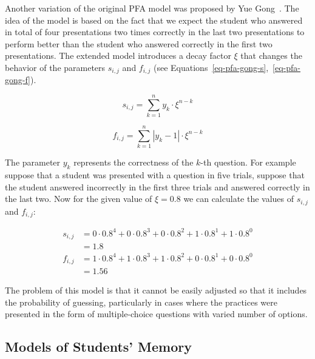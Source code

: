 Another variation of the original PFA model was proposed by Yue Gong~\cite{Gong2011}. The idea of the model is based on the fact that we expect the student who answered in total of four presentations two times correctly in the last two presentations to perform better than the student who answered correctly in the first two presentations. The extended model introduces a decay factor $\xi$ that changes the behavior of the parameters $s_{i,j}$ and $f_{i,j}$ (see Equations~\ref{eq-pfa-gong-s},~\ref{eq-pfa-gong-f}).

\begin{equation} \label{eq-pfa-gong-s}
  s_{i,j} = \sum_{k=1}^{n} y_k \cdot \xi^{n-k}
\end{equation}

\begin{equation} \label{eq-pfa-gong-f}
  f_{i,j} = \sum_{k=1}^{n} |y_k - 1| \cdot \xi^{n-k}
\end{equation}

The parameter $y_k$ represents the correctness of the $k$-th question. For example suppose that a student was presented with a question in five trials, suppose that the student answered incorrectly in the first three trials and answered correctly in the last two. Now for the given value of $\xi = 0.8$ we can calculate the values of $s_{i,j}$ and $f_{i,j}$:

\begin{equation} \label{eq-pfa-gong-s-example}
  \begin{split}
  s_{i,j} & = 0 \cdot 0.8^4 + 0 \cdot 0.8^3 + 0 \cdot 0.8^2 + 1 \cdot 0.8^1 + 1 \cdot 0.8^0 \\
  & = 1.8 \\
  f_{i,j} & = 1 \cdot 0.8^4 + 1 \cdot 0.8^3 + 1 \cdot 0.8^2 + 0 \cdot 0.8^1 + 0 \cdot 0.8^0 \\
  & = 1.56
  \end{split}
\end{equation}

The problem of this model is that it cannot be easily adjusted so that it includes the probability of guessing, particularly in cases where the practices were presented in the form of multiple-choice questions with varied number of options.

\subsection{Models of Students' Memory}
\label{spacing-effect}


